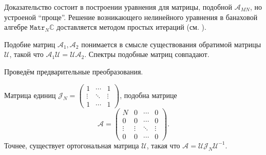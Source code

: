 Доказательство состоит в построении уравнения для матрицы, подобной \( \mathscr{A}_{MN} \),
 но устроеной ``проще''. Решение возникающего нелинейного уравнения
 в банаховой алгебре \( \mathtt{Matr}_N\mathbb{C} \)
 доставляется методом простых итераций (см. \cite{baskakov-harmonic}).

Подобие матриц \( \mathcal{A}_1, \mathcal{A}_2 \)
 понимается в смысле существования обратимой матрицы \( \mathcal{U} \),
 такой что \( \mathcal{A}_1 \mathcal{U} = \mathcal{U} \mathcal{A}_2 \).
Спектры подобные матриц совпадают.

Провед\"ем предварительные преобразования.

\begin{lem}
    Матрица единиц 
    \( \mathcal{J}_N =
    \begin{pmatrix}
        1 & \cdots & 1 \\
        \vdots & \ddots & \vdots \\ 
    1 & \cdots & 1 \end{pmatrix} \),
    подобна матрице
    \[
        \mathcal{A} = \begin{pmatrix}
            N & 0 & \cdots & 0 \\
            0 & 0 & \cdots & 0 \\
            \vdots & \vdots & \ddots & \vdots \\
            0 & 0 & \cdots & 0 \end{pmatrix}. \]
    Точнее, существует ортогональная матрица \( \mathcal{U} \),
    такая что
    \( \mathcal{A} = \mathcal{U}\mathcal{J}_N \mathcal{U}^{-1} \).
\end{lem}
